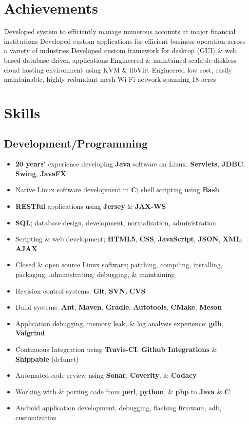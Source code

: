 \documentclass[10pt]{report}
\title{}
\author{}
\date{}
\begin{document}
\setlength\parindent{0pt}

\section*{Achievements}
Developed system to efficiently manage numerous accounts at major financial institutions\newline
Developed custom applications for efficient business operation across a variety of industries\newline
Developed custom framework for desktop (GUI) \& web based database driven applications\newline
Engineered \& maintained scalable diskless cloud hosting environment using KVM \& libVirt\newline
Engineered low cost, easily maintainable, highly redundant mesh Wi-Fi network spanning 18-acres

\section*{Skills}
\subsection*{Development/Programming}
\begin{itemize}
  \item \textbf{20 years’} experience developing \textbf{Java} software on Linux; \textbf{Servlets}, \textbf{JDBC}, \textbf{Swing}, \textbf{JavaFX}
  \item Native Linux software development in \textbf{C}; shell scripting using \textbf{Bash}
  \item \textbf{RESTful} applications using \textbf{Jersey} \& \textbf{JAX-WS}
  \item \textbf{SQL}; database design, development, normalization, administration
  \item Scripting \& web development; \textbf{HTML5}, \textbf{CSS}, \textbf{JavaScript}, \textbf{JSON}, \textbf{XML}, \textbf{AJAX}
  \item Closed \& open source Linux software; patching, compiling, installing, packaging, administrating,
debugging, \& maintaining
  \item Revision control systems: \textbf{Git}, \textbf{SVN}, \textbf{CVS}
  \item Build systems: \textbf{Ant}, \textbf{Maven}, \textbf{Gradle}, \textbf{Autotools}, \textbf{CMake}, \textbf{Meson}
  \item Application debugging, memory leak, \& log analysis experience: \textbf{gdb}, \textbf{Valgrind}
  \item Continuous Integration using \textbf{Travis-CI}, \textbf{Github Integrations} \& \textbf{Shippable} (defunct)
  \item Automated code review using \textbf{Sonar}, \textbf{Coverity}, \& \textbf{Codacy}
  \item Working with \& porting code from \textbf{perl}, \textbf{python}, \& \textbf{php} to \textbf{Java} \& \textbf{C}
  \item Android application development, debugging, flashing firmware, adb, customization
\end{itemize}
\vspace{-1em}
\end{document}
